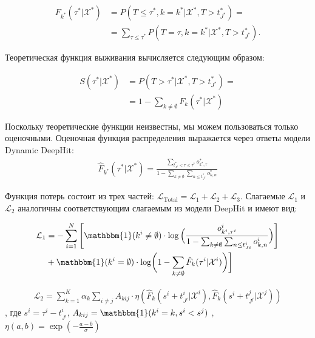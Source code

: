 \documentclass{article}
\begin{document}
\begin{equation}
	\begin{aligned}
		F_{k^{*}}(\tau^{*}|\mathcal{X}^{*}) & = P(T\leq\tau^{*},k=k^{*}|\mathcal{X}^{*},T>t_{J^{*}}^{*}) = \\
		& =\sum_{\tau\leq\tau^*}P(T=\tau,k=k^*|\mathcal{X}^*,T>t_{J^*}^*).
	\end{aligned}
\end{equation}

Теоретическая функция выживания вычисляется следующим образом:

\begin{equation}
	\begin{aligned}
		S(\tau^{*}|\mathcal{X}^{*}) & = 
		P(T>\tau^*|\mathcal{X}^*,T>t_{J^*}^*) =\\
		& =1-\sum_{k\neq\emptyset}F_k(\tau^*|\mathcal{X}^*)
	\end{aligned}
\end{equation}

Поскольку теоретические функции неизвестны, мы можем пользоваться только оценочными. Оценочная функция распределения выражается через ответы модели Dynamic DeepHit:
\begin{equation}
	\begin{aligned}
		\hat{F}_{k^*}(\tau^*|\mathcal{X}^*)=\frac{\sum_{t_{J^*}^*<\tau\leq\tau^*}o_{k^*,\tau}^*}{1-\sum_{k\neq\emptyset}\sum_{n\leq t_{J^*}^*}o_{k,n}^*}
	\end{aligned}
\end{equation}

Функция потерь состоит из трех частей: $\mathcal{L}_{\mathrm{Total}}=\mathcal{L}_1+\mathcal{L}_2+\mathcal{L}_3$. Слагаемые $\mathcal{L}_1$ и $\mathcal{L}_2$ аналогичны соответствующим слагаемым из модели DeepHit и имеют вид: 

\begin{equation}
	\begin{aligned}
		\mathcal{L}_{1} & =-\sum_{i=1}^N\left[\mathbbm{1}(k^i\neq\emptyset)\cdot\log\Big(\frac{o_{k^i,\tau^i}^i}{1-\sum_{k\neq\emptyset}\sum_{n\leq t_{Ji}^i}o_{k,n}^i}\Big)\right] \\
		& +\mathbbm{1}(k^i=\emptyset)\cdot\log\biggl(1-\sum_{k\neq\emptyset}\hat{F}_k(\tau^i|\mathcal{X}^i)\biggr)\biggr]
	\end{aligned}
\end{equation}

\begin{equation}
	\begin{aligned}
		\mathcal{L}_2=\sum_{k=1}^K\alpha_k\sum_{i\neq j}A_{kij}\cdot\eta\left(\hat{F}_k(s^i+t_{J^i}^i|\mathcal{X}^i),\hat{F}_k(s^i+t_{J^j}^j|\mathcal{X}^j)\right)
	\end{aligned}
\end{equation}
, где $s^i=\tau^i-t_{J^i}^i$, $A_{kij}=\mathbbm{1}(k^i=k,s^i<s^j)$ , $\eta(a,b)=\exp\left(-\frac{a-b}{\sigma}\right)$
\end{document}
